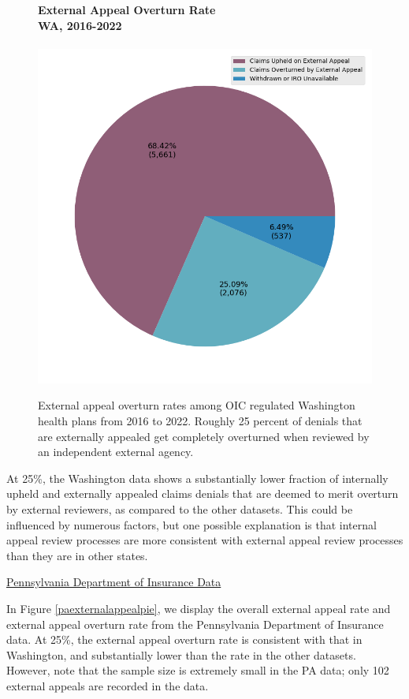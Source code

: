 \documentclass[12pt, a4paper,twoside,parskip=full]{report}
\theoremstyle{plain} %
\theoremstyle{definition} %
\theoremstyle{remark} %
\numberwithin{equation}{chapter}
\begin{document}
		
		\begin{figure}[h!]
			\centering
			\textbf{External Appeal Overturn Rate}\\
			\textbf{WA, 2016-2022}\\\
			\includegraphics[width=.4\textwidth]{images/wa_external_appeals/external_appeal_success_rates.png}
			\caption{External appeal overturn rates among OIC regulated Washington health plans from 2016 to 2022. Roughly 25 percent of denials that are externally appealed get completely overturned when reviewed by an independent external agency.}
			\label{waexternalappealpie}
		\end{figure}
	
		\clearpage
	
		At 25\%, the Washington data shows a substantially lower fraction of internally upheld and externally appealed claims denials that are deemed to merit overturn by external reviewers, as compared to the other datasets. This could be influenced by numerous factors, but one possible explanation is that internal appeal review processes are more consistent with external appeal review processes than they are in other states.
		
		\underline{Pennsylvania Department of Insurance Data}
		
		In Figure \ref{paexternalappealpie}, we display the overall external appeal rate and external appeal overturn rate from the Pennsylvania Department of Insurance data. At 25\%, the external appeal overturn rate is consistent with that in Washington, and substantially lower than the rate in the other datasets. However, note that the sample size is extremely small in the PA data; only 102 external appeals are recorded in the data.
		
\end{document}
